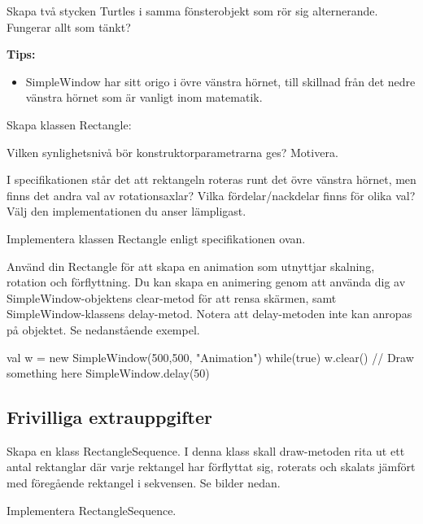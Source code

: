 \Subtask Skapa två stycken Turtles i samma fönsterobjekt som rör sig alternerande. Fungerar allt som tänkt?

\textbf{Tips:}
\begin{itemize}
\item SimpleWindow har sitt origo i övre vänstra hörnet, till skillnad från det nedre vänstra hörnet som är vanligt inom matematik.
\end{itemize}

\Task Skapa klassen Rectangle: 


\Subtask Vilken synlighetsnivå bör konstruktorparametrarna ges? Motivera.

\Subtask I specifikationen står det att rektangeln roteras runt det övre vänstra hörnet, men finns det andra val av rotationsaxlar? Vilka fördelar/nackdelar finns för olika val?
Välj den implementationen du anser lämpligast.

\Subtask Implementera klassen Rectangle enligt specifikationen ovan.

\Subtask Använd din Rectangle för att skapa en animation som utnyttjar skalning, rotation och förflyttning.
Du kan skapa en animering genom att använda dig av SimpleWindow-objektens clear-metod för att rensa skärmen, samt SimpleWindow-klassens delay-metod.
Notera att delay-metoden inte kan anropas på objektet. Se nedanstående exempel.

\begin{Code}
val w = new SimpleWindow(500,500, "Animation")
while(true){
	w.clear()
	// Draw something here
	SimpleWindow.delay(50)
}
\end{Code}




\subsection{Frivilliga extrauppgifter}


\Task Skapa en klass RectangleSequence. I denna klass skall draw-metoden rita ut ett antal rektanglar där varje rektangel har förflyttat sig, roterats och skalats jämfört med föregående rektangel i sekvensen. Se bilder nedan.



\Subtask Implementera RectangleSequence.

